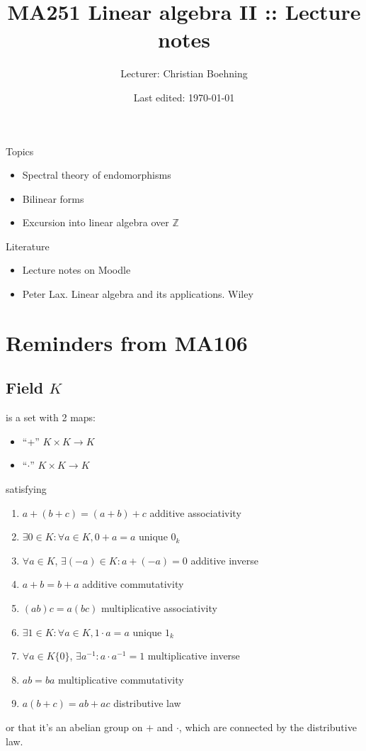 \documentclass[a4paper]{article}
\title{MA251 Linear algebra II :: Lecture notes}
\author{Lecturer: Christian Boehning}
\date{Last edited: \today}
\theoremstyle{definition}
\begin{document}
\maketitle
\thispagestyle{empty}

\tableofcontents
\thispagestyle{empty}
\newpage
\setcounter{page}{1}

Topics
\begin{itemize}
	\item Spectral theory of endomorphisms
	\item Bilinear forms
	\item Excursion into linear algebra over $\mathbb Z$ 
\end{itemize}
Literature

\begin{itemize}
	\item Lecture notes on Moodle
	\item Peter Lax. Linear algebra and its applications. Wiley
\end{itemize}

\section{Reminders from MA106}
\subsection{Field $K$} 
is a set with 2 maps:
\begin{itemize}
	\item ``+'' $K \times K \rightarrow K$
	\item ``$\cdot$'' $K \times K \rightarrow K$
\end{itemize} satisfying

\begin{enumerate}
	\item $a+(b+c)=(a+b)+c$ \qquad additive associativity
	\item $\exists 0 \in K : \forall a \in K, 0+a=a$ \qquad unique $0_k$
	\item $\forall a \in K$, $\exists (-a) \in K : a+(-a)=0$ \qquad additive inverse
	\item $a+b=b+a$ \qquad additive commutativity
	\item $(ab)c=a(bc)$ \qquad multiplicative associativity
	\item $\exists 1 \in K : \forall a \in K, 1 \cdot a =a$ \qquad unique $1_k$ \quad [$0_k \neq 1_k$]
	\item $\forall a \in K \{0\}$, $\exists a^{-1} : a \cdot a^{-1}=1$ \qquad multiplicative inverse
	\item $ab=ba$ \qquad multiplicative commutativity
	\item $a(b+c)=ab+ac$ \qquad distributive law
\end{enumerate}
or that it's an abelian group on $+$ and $\cdot$, which are connected by the distributive law.
\end{document}
